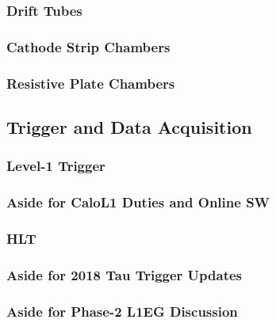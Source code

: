 \subsubsection{Drift Tubes}
\subsubsection{Cathode Strip Chambers}
\subsubsection{Resistive Plate Chambers}
\subsection{Trigger and Data Acquisition}
\subsubsection{Level-1 Trigger}
\subsubsection{Aside for CaloL1 Duties and Online SW}
\subsubsection{HLT}
\subsubsection{Aside for 2018 Tau Trigger Updates}
\subsubsection{Aside for Phase-2 L1EG Discussion}
